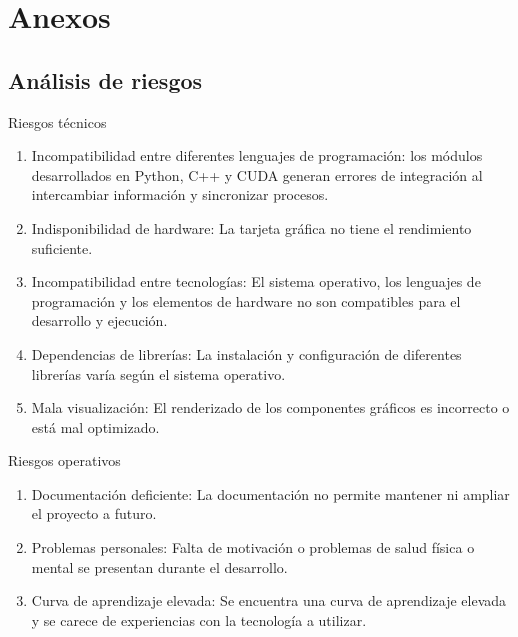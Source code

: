 \section*{Anexos}

\subsection*{Análisis de riesgos}

\begin{frame}{Riesgos técnicos}
	\begin{enumerate}[label*=RT\arabic*]
		\item Incompatibilidad entre diferentes lenguajes de programación: los módulos desarrollados en Python, C++ y CUDA generan errores de integración al intercambiar información y sincronizar procesos.
		
		\item Indisponibilidad de hardware: La tarjeta gráfica no tiene el rendimiento suficiente.
		
		\item Incompatibilidad entre tecnologías: El sistema operativo, los lenguajes de programación y los elementos de hardware no son compatibles para el desarrollo y ejecución.
		
		\item Dependencias de librerías: La instalación y configuración de diferentes librerías varía según el sistema operativo.
		
		\item Mala visualización: El renderizado de los componentes gráficos es incorrecto o está mal optimizado.
	\end{enumerate}
\end{frame}

\begin{frame}{Riesgos operativos}
	\begin{enumerate}[label*=RO\arabic*]
		\item Documentación deficiente: La documentación no permite mantener ni ampliar el proyecto a futuro.
		
		\item Problemas personales: Falta de motivación o problemas de salud física o mental se presentan durante el desarrollo.
		
		\item Curva de aprendizaje elevada: Se encuentra una curva de aprendizaje elevada y se carece de experiencias con la tecnología a utilizar.
	\end{enumerate}
\end{frame}

